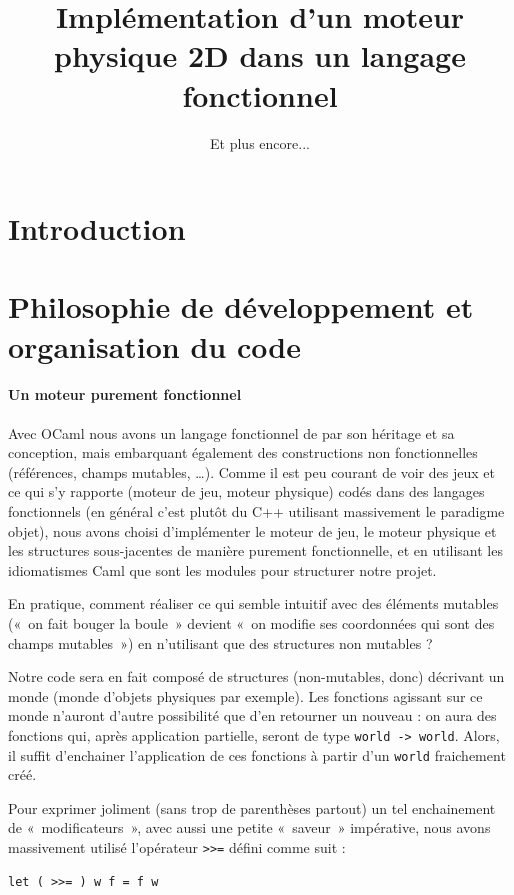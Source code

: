 \documentclass[a4paper]{scrartcl}
\title{Implémentation d'un moteur physique 2D dans un langage fonctionnel}
\subtitle{Et plus encore...}
\begin{document}
\maketitle

\tableofcontents

\newpage

\section*{Introduction}

\section{Philosophie de développement et organisation du code}
\paragraph{Un moteur purement fonctionnel}

Avec OCaml nous avons un langage fonctionnel de par son héritage et sa
conception, mais embarquant également des constructions non
fonctionnelles (références, champs mutables, …). Comme il est peu
courant de voir des jeux et ce qui s'y rapporte (moteur de jeu, moteur
physique) codés dans des langages fonctionnels (en général c'est
plutôt du C++ utilisant massivement le paradigme objet), nous avons
choisi d'implémenter le moteur de jeu, le moteur physique et les
structures sous-jacentes de manière purement fonctionnelle, et en
utilisant les idiomatismes Caml que sont les modules pour structurer
notre projet.

En pratique, comment réaliser ce qui semble intuitif avec des éléments
mutables («~on fait bouger la boule~» devient «~on modifie ses
coordonnées qui sont des champs mutables~») en n'utilisant que des
structures non mutables ?

Notre code sera en fait composé de structures (non-mutables, donc)
décrivant un monde (monde d'objets physiques par exemple). Les
fonctions agissant sur ce monde n'auront d'autre possibilité que d'en
retourner un nouveau : on aura des fonctions qui, après application
partielle, seront de type \texttt{world -> world}. Alors, il suffit
d'enchainer l'application de ces fonctions à partir d'un
\texttt{world} fraichement créé.

Pour exprimer joliment (sans trop de parenthèses partout) un tel
enchainement de «~modificateurs~», avec aussi une petite «~saveur~»
impérative, nous avons massivement utilisé l'opérateur \texttt{>>=}
défini comme suit :
\begin{verbatim}
let ( >>= ) w f = f w
\end{verbatim}
\end{document}
